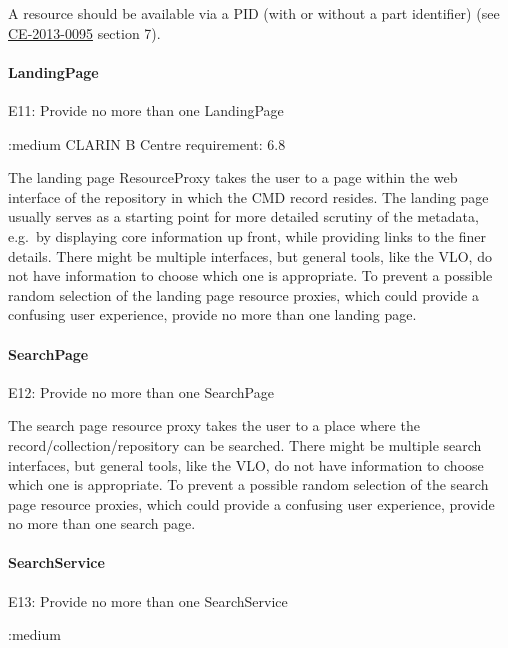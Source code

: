 A resource should be available via a PID (with or without a part identifier) (see
\href{http://hdl.handle.net/1839/00-DOCS.CLARIN.EU-78}{CE-2013-0095} section 7).

\paragraph{LandingPage}\label{landingpage}

\label{e11}
E11: Provide no more than one LandingPage

\priority:{medium CLARIN B Centre requirement: 6.8}

The landing page ResourceProxy takes the user to a page within the web interface of the repository in which the CMD record resides. The landing page usually serves as a starting point for more detailed scrutiny of the metadata, e.g.~by displaying core information up front, while providing links to the finer details. There might be multiple interfaces, but general tools, like the VLO, do not have information to choose which one is appropriate. To prevent a possible random selection
of the landing page resource proxies, which could provide a confusing user experience, provide no more than one landing page.

\paragraph{SearchPage}\label{searchpage}

E12: Provide no more than one SearchPage

 

The search page resource proxy takes the user to a place where the record/collection/repository can be searched. There might be multiple search interfaces, but general tools, like the VLO, do not have information to choose which one is appropriate. To prevent a possible random selection of the search page resource proxies, which could provide a confusing user experience, provide no more than one search page.

\paragraph{SearchService}\label{searchservice}

E13: Provide no more than one SearchService

\priority:{medium} 

